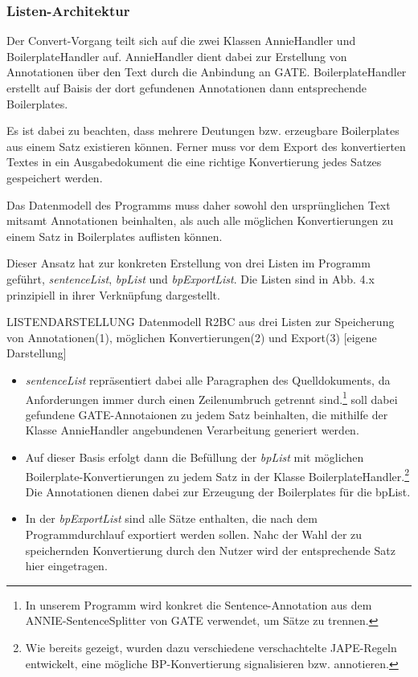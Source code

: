 \documentclass[12pt]{report}
\begin{document}
\subsubsection{Listen-Architektur}
Der Convert-Vorgang teilt sich auf die zwei Klassen AnnieHandler und BoilerplateHandler auf. AnnieHandler dient dabei zur Erstellung von Annotationen über den Text durch die Anbindung an GATE. BoilerplateHandler erstellt auf Baisis der dort gefundenen Annotationen dann entsprechende Boilerplates. 

Es ist dabei zu beachten, dass mehrere Deutungen bzw. erzeugbare Boilerplates aus einem Satz existieren können. Ferner muss vor dem Export des konvertierten Textes in ein Ausgabedokument die eine richtige Konvertierung jedes Satzes gespeichert werden.

Das Datenmodell des Programms muss daher sowohl den ursprünglichen Text mitsamt Annotationen beinhalten, als auch alle möglichen Konvertierungen zu einem Satz in Boilerplates auflisten können.

Dieser Ansatz hat zur konkreten Erstellung von drei Listen im Programm geführt, \textit{sentenceList}, \textit{bpList} und \textit{bpExportList}. Die Listen sind in Abb. 4.x prinzipiell in ihrer Verknüpfung dargestellt. 

LISTENDARSTELLUNG Datenmodell R2BC aus drei Listen zur Speicherung von Annotationen(1), möglichen Konvertierungen(2) und Export(3) [eigene Darstellung]

\begin{itemize}
\item \textit{sentenceList} repräsentiert dabei alle Paragraphen des Quelldokuments, da Anforderungen immer durch einen Zeilenumbruch getrennt sind.\footnote{In unserem Programm wird konkret die Sentence-Annotation aus dem ANNIE-SentenceSplitter von GATE verwendet, um Sätze zu trennen.} soll dabei gefundene GATE-Annotaionen zu jedem Satz beinhalten, die mithilfe der Klasse AnnieHandler angebundenen Verarbeitung generiert werden.
\item Auf dieser Basis erfolgt dann die Befüllung der \textit{bpList} mit möglichen Boilerplate-Konvertierungen zu jedem Satz in der Klasse BoilerplateHandler.\footnote{Wie bereits gezeigt, wurden dazu verschiedene verschachtelte JAPE-Regeln entwickelt, eine mögliche BP-Konvertierung signalisieren bzw. annotieren.} Die Annotationen dienen dabei zur Erzeugung der Boilerplates für die bpList.
\item In der \textit{bpExportList} sind alle Sätze enthalten, die nach dem Programmdurchlauf exportiert werden sollen. Nahc der Wahl der zu speichernden Konvertierung durch den Nutzer wird der entsprechende Satz hier eingetragen.
\end{itemize}
\end{document}
